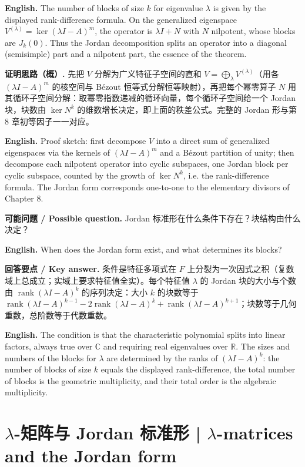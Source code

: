 \documentclass[UTF8,11pt,a4paper]{ctexart}
\newcommand{\EN}[1]{\par\noindent\textbf{English.} #1\par}
\newcommand{\ASK}[4]{\par\noindent\textbf{可能问题 / Possible question.} #1\par\EN{#2}\noindent\textbf{回答要点 / Key answer.} #3\par\EN{#4}\medskip}
\begin{document}
\EN{The number of blocks of size $k$ for eigenvalue $\lambda$ is given by the displayed rank-difference formula. On the generalized eigenspace $V^{(\lambda)}=\ker(\lambda I-A)^m$, the operator is $\lambda I+N$ with $N$ nilpotent, whose blocks are $J_k(0)$. Thus the Jordan decomposition splits an operator into a diagonal (semisimple) part and a nilpotent part, the essence of the theorem.}
\noindent\textbf{证明思路（概）.} 先把 $V$ 分解为广义特征子空间的直和 $V=\bigoplus_\lambda V^{(\lambda)}$（用各 $(\lambda I-A)^{m}$ 的核空间与 Bézout 恒等式分解恒等映射），再把每个幂零算子 $N$ 用其循环子空间分解：取幂零指数递减的循环向量，每个循环子空间给一个 Jordan 块，块数由 $\ker N^k$ 的维数增长决定，即上面的秩差公式。完整的 Jordan 形与第 8 章初等因子一一对应。
\EN{Proof sketch: first decompose $V$ into a direct sum of generalized eigenspaces via the kernels of $(\lambda I-A)^m$ and a Bézout partition of unity; then decompose each nilpotent operator into cyclic subspaces, one Jordan block per cyclic subspace, counted by the growth of $\ker N^k$, i.e. the rank-difference formula. The Jordan form corresponds one-to-one to the elementary divisors of Chapter 8.}
\ASK{Jordan 标准形在什么条件下存在？块结构由什么决定？}{When does the Jordan form exist, and what determines its blocks?}{条件是特征多项式在 $F$ 上分裂为一次因式之积（复数域上总成立；实域上要求特征值全实）。每个特征值 $\lambda$ 的 Jordan 块的大小与个数由 $\operatorname{rank}(\lambda I-A)^k$ 的序列决定：大小 $k$ 的块数等于 $\operatorname{rank}(\lambda I-A)^{k-1}-2\operatorname{rank}(\lambda I-A)^k+\operatorname{rank}(\lambda I-A)^{k+1}$；块数等于几何重数，总阶数等于代数重数。}{The condition is that the characteristic polynomial splits into linear factors, always true over $\mathbb C$ and requiring real eigenvalues over $\mathbb R$. The sizes and numbers of the blocks for $\lambda$ are determined by the ranks of $(\lambda I-A)^k$: the number of blocks of size $k$ equals the displayed rank-difference, the total number of blocks is the geometric multiplicity, and their total order is the algebraic multiplicity.}

\section{\texorpdfstring{$\lambda$}{λ}-矩阵与 Jordan 标准形 | \texorpdfstring{$\lambda$}{λ}-matrices and the Jordan form}
\end{document}
